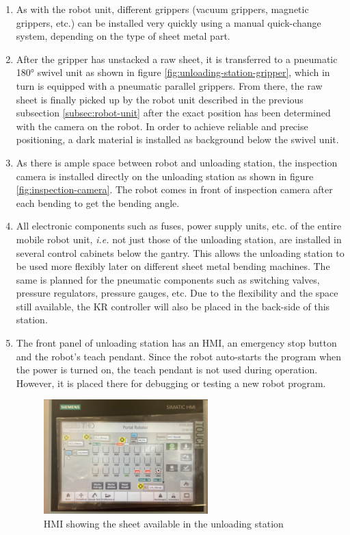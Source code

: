 \begin{enumerate}
    \item As with the robot unit, different grippers (vacuum grippers, magnetic grippers, etc.) can be
    installed very quickly using a manual quick-change system, depending on the type of sheet metal part.
    \item After the gripper has unstacked a raw sheet, it is transferred to a pneumatic 180° swivel unit as shown in figure \ref{fig:unloading-station-gripper}, which in
    turn is equipped with a pneumatic parallel grippers. From
    there, the raw sheet is finally picked up by the robot unit described in the previous subsection \ref{subsec:robot-unit} after the
    exact position has been determined with the camera on the robot. In order to achieve reliable and
    precise positioning, a dark material is installed as background below the swivel unit. 
    \item As there is ample space between robot and unloading station, the inspection camera is installed directly on the unloading station as shown in figure \ref{fig:inspection-camera}.
    The robot comes in front of inspection camera after each bending to get the bending angle.
    \item All electronic
    components such as fuses, power supply units, etc. of the entire mobile robot unit, \textit{i.e.} not just those of
    the unloading station, are installed in several control cabinets below the gantry. This allows the
    unloading station to be used more flexibly later on different sheet metal bending machines. The same is
    planned for the pneumatic components such as switching valves, pressure regulators, pressure
    gauges, etc. Due to the flexibility and the space still available, the KR controller will also be
    placed in the back-side of this station.
    \item The front panel of unloading station has an HMI, an emergency stop button and the robot's teach pendant. Since the robot auto-starts the program
    when the power is turned on, the teach pendant is not used during operation. However, it is placed there for debugging or testing a new robot program.

    \begin{figure}[h]
        \centering
        \includegraphics[width=0.6\textwidth]{figures/simatic-hmi.jpeg}
        \caption{HMI showing the sheet available in the unloading station}
        \label{fig:simatic-hmi}
    \end{figure}


\end{enumerate}
